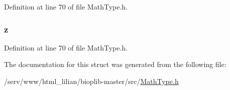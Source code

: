 Definition at line 70 of file Math\-Type.\-h.

\hypertarget{struct_v_e_c3_f_a9195b0e2ec564479b8a02cc3357410b7}{
\subsubsection[{z}]{ z}}\label{struct_v_e_c3_f_a9195b0e2ec564479b8a02cc3357410b7}


Definition at line 70 of file Math\-Type.\-h.



The documentation for this struct was generated from the following file\-:\begin{DoxyCompactItemize}
\item 
/serv/www/html\-\_\-lilian/bioplib-\/master/src/\hyperlink{_math_type_8h}{Math\-Type.\-h}\end{DoxyCompactItemize}
